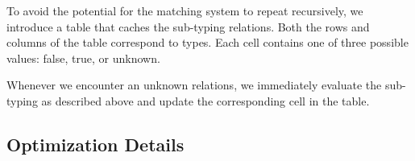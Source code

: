 To avoid the potential for the matching system to repeat recursively, we introduce a table that caches the sub-typing relations. Both the rows and columns of the table correspond to types. Each cell contains one of three possible values: false, true, or unknown. 

Whenever we encounter an unknown relations, we immediately evaluate the sub-typing as described above and update the corresponding cell in the table.

\subsection{Optimization Details}
\label{ssec:optimization-details}

